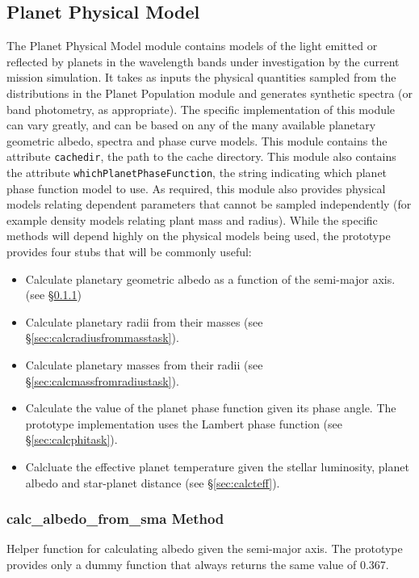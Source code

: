 \documentclass[cleanfoot]{asme2ej}
\begin{document}
\subsection{Planet Physical Model} \label{sec:planetphysicalmodel}
The Planet Physical Model module contains models of the light emitted or reflected by planets in the wavelength bands under investigation by the current mission simulation.  It takes as inputs the physical quantities sampled from the distributions in the Planet Population module and generates synthetic spectra (or band photometry, as appropriate).  The specific implementation of this module can vary greatly, and can be based on any of the many available planetary geometric albedo, spectra and phase curve models.  This module contains the attribute \texttt{cachedir}, the path to the cache directory. This module also contains the attribute \texttt{whichPlanetPhaseFunction}, the string indicating which planet phase function model to use. As required, this module also provides physical models relating dependent parameters that cannot be sampled independently (for example density models relating plant mass and radius).  While the specific methods will depend highly on the physical models being used, the prototype provides four stubs that will be commonly useful:
\begin{itemize}[leftmargin=2in,font={\ttfamily}]
    \item[\texttt calc\_albedo\_from\_sma] Calculate planetary geometric albedo as a function of the semi-major axis. (see \S\ref{sec:calcalbedofromsmatask})
    \item[\texttt calc\_radius\_from\_mass] Calculate planetary radii from their masses (see \S\ref{sec:calcradiusfrommasstask}).
    \item[\texttt calc\_mass\_from\_radius] Calculate planetary masses from their radii (see \S\ref{sec:calcmassfromradiustask}).
    \item[\texttt calc\_Phi] Calculate the value of the planet phase function given its phase angle. The prototype implementation uses the Lambert phase function (see \S\ref{sec:calcphitask}).
    \item[\texttt calc\_Teff] Calcluate the effective planet temperature given the stellar luminosity, planet albedo and star-planet distance (see \S\ref{sec:calcteff}).
\end{itemize}

\subsubsection{calc\_albedo\_from\_sma Method} \label{sec:calcalbedofromsmatask}
Helper function for calculating albedo given the semi-major axis. The prototype provides only a dummy function that always returns the same value of 0.367.
\end{document}
